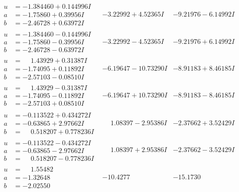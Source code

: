 \documentclass[1p]{elsarticle_modified}
\theoremstyle{definition}
\begin{document}
$$\begin{array}{c|c|c}
\begin{aligned}
u &= -1.384460 + 0.144996 I \\
a &= -1.75860 + 0.39956 I \\
b &= -2.46728 + 0.63972 I\end{aligned}
 & -3.22992 + 4.52365 I & -9.21976 - 6.14992 I \\ \hline\begin{aligned}
u &= -1.384460 - 0.144996 I \\
a &= -1.75860 - 0.39956 I \\
b &= -2.46728 - 0.63972 I\end{aligned}
 & -3.22992 - 4.52365 I & -9.21976 + 6.14992 I \\ \hline\begin{aligned}
u &= \phantom{-}1.43929 + 0.31387 I \\
a &= -1.74095 + 0.11892 I \\
b &= -2.57103 - 0.08510 I\end{aligned}
 & -6.19647 - 10.73290 I & -8.91183 + 8.46185 I \\ \hline\begin{aligned}
u &= \phantom{-}1.43929 - 0.31387 I \\
a &= -1.74095 - 0.11892 I \\
b &= -2.57103 + 0.08510 I\end{aligned}
 & -6.19647 + 10.73290 I & -8.91183 - 8.46185 I \\ \hline\begin{aligned}
u &= -0.113522 + 0.434272 I \\
a &= -0.63865 + 2.97662 I \\
b &= \phantom{-}0.518207 + 0.778236 I\end{aligned}
 & \phantom{-}1.08397 - 2.95386 I & -2.37662 + 3.52429 I \\ \hline\begin{aligned}
u &= -0.113522 - 0.434272 I \\
a &= -0.63865 - 2.97662 I \\
b &= \phantom{-}0.518207 - 0.778236 I\end{aligned}
 & \phantom{-}1.08397 + 2.95386 I & -2.37662 - 3.52429 I \\ \hline\begin{aligned}
u &= \phantom{-}1.55482\phantom{ +0.000000I} \\
a &= -1.32648\phantom{ +0.000000I} \\
b &= -2.02550\phantom{ +0.000000I}\end{aligned}
 & -10.4277\phantom{ +0.000000I} & -15.1730\phantom{ +0.000000I} \\ \hline\begin{aligned}

\end{aligned}
\end{array}$$
\end{document}
